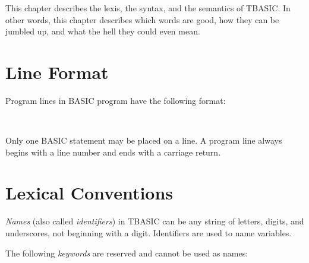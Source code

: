 This chapter describes the lexis, the syntax, and the semantics of TBASIC. In other words, this chapter describes which words are good, how they can be jumbled up, and what the hell they could even mean. 

\section{Line Format}

Program lines in BASIC program have the following format:

 \

Only one BASIC statement may be placed on a line. A program line always begins with a line number and ends with a carriage return.


\section{Lexical Conventions}

\emph{Names} (also called \emph{identifiers}) in TBASIC can be any string of letters, digits, and underscores, not beginning with a digit. Identifiers are used to name variables.

The following \emph{keywords} are reserved and cannot be used as names:

